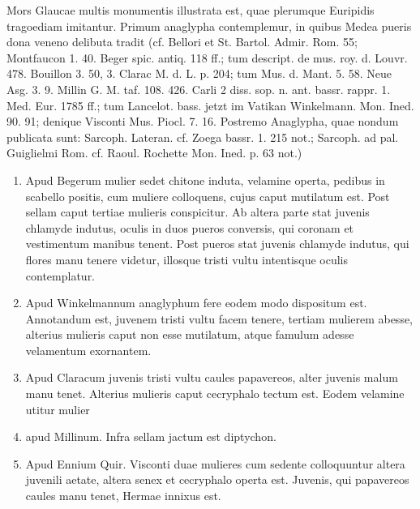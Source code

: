 \documentclass[a4paper, 11pt, oneside, polutonikogreek, german]{article}
\begin{document}
Mors Glaucae multis monumentis illustrata est, quae plerumque Euripidis tragoediam imitantur. Primum anaglypha contemplemur, in quibus Medea pueris dona veneno delibuta tradit (cf. Bellori et St. Bartol. Admir. Rom. 55; Montfaucon 1. 40. Beger spic. antiq. 118 ff.; tum descript. de mus. roy. d. Louvr. 478. Bouillon 3. 50, 3. Clarac M. d. L. p. 204; tum Mus. d. Mant. 5. 58. Neue Asg. 3. 9. Millin G. M. taf. 108. 426. Carli 2 diss. sop. n. ant. bassr. rappr. 1. Med. Eur. 1785 ff.; tum Lancelot. bass. jetzt im Vatikan Winkelmann. Mon. Ined. 90. 91; denique Visconti Mus. Piocl. 7. 16. Postremo Anaglypha, quae nondum publicata sunt: Sarcoph. Lateran. cf. Zoega bassr. 1. 215 not.; Sarcoph. ad pal. Guiglielmi Rom. cf. Raoul. Rochette Mon. Ined. p. 63 not.)
\begin{enumerate}
    \item Apud Begerum mulier sedet chitone induta, velamine operta, pedibus in scabello positis, cum muliere colloquens, cujus caput mutilatum est. Post sellam caput tertiae mulieris conspicitur. Ab altera parte stat juvenis chlamyde indutus, oculis in duos pueros conversis, qui coronam et vestimentum manibus tenent. Post pueros stat juvenis chlamyde indutus, qui flores manu tenere videtur, illosque tristi vultu intentisque oculis contemplatur.

    \item Apud Winkelmannum anaglyphum fere eodem modo dispositum est. Annotandum est, juvenem tristi vultu facem tenere, tertiam mulierem abesse, alterius mulieris caput non esse mutilatum, atque famulum adesse velamentum exornantem.

    \item Apud Claracum juvenis tristi vultu caules papavereos, alter juvenis malum manu tenet. Alterius mulieris caput cecryphalo tectum est. Eodem velamine utitur mulier

    \item apud Millinum. Infra sellam jactum est diptychon.

    \item Apud Ennium Quir. Visconti duae mulieres cum sedente colloquuntur altera juvenili aetate, altera senex et cecryphalo operta est. Juvenis, qui papavereos caules manu tenet, Hermae innixus est.
\end{enumerate}
\end{document}
